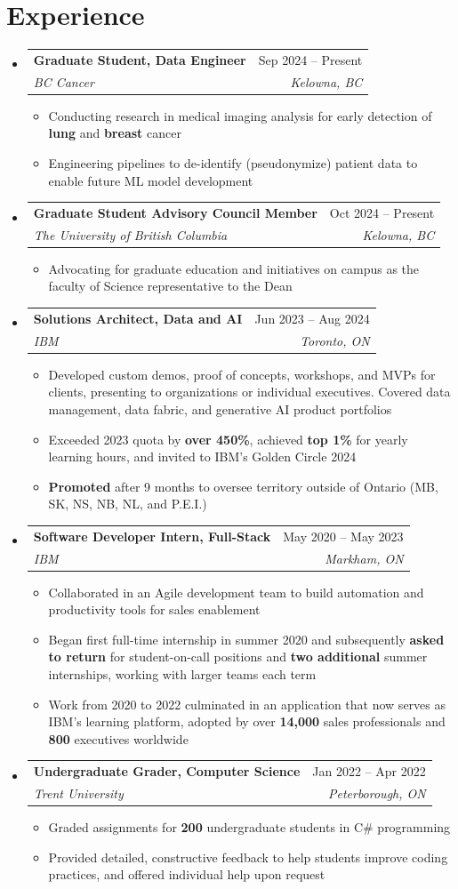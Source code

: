 \documentclass[letterpaper,10pt]{article}
\makeatletter
\newcommand{\resumeItem}[1]{
  \item\small{
    {#1 \vspace{-2pt}}
  }
}
\newcommand{\resumeSubheading}[4]{
  \vspace{-0.9pt}\item
    \begin{tabular*}{0.97\textwidth}[t]{l@{\extracolsep{\fill}}r}
      \textbf{\small#1} & \small#2 \\
      \textit{\small#3} & \textit{\small #4} \\
    \end{tabular*}\vspace{-7pt}
}
\newcommand{\resumeSubHeadingListStart}{\begin{itemize}[leftmargin=0.15in, label={}]}
\newcommand{\resumeSubHeadingListEnd}{\end{itemize}}
\newcommand{\resumeItemListStart}{\begin{itemize}}
\newcommand{\resumeItemListEnd}{\end{itemize}\vspace{-5pt}}
\makeatother
\begin{document}
\section{Experience}
  \resumeSubHeadingListStart
    \resumeSubheading
      {Graduate Student, Data Engineer}{Sep 2024 -- Present}
      {BC Cancer}{Kelowna, BC}
      \resumeItemListStart
        \resumeItem{Conducting research in medical imaging analysis for early detection of \textbf{lung} and \textbf{breast} cancer}
        \resumeItem{Engineering pipelines to de-identify (pseudonymize) patient data to enable future ML model development}
      \resumeItemListEnd
    \resumeSubheading
      {Graduate Student Advisory Council Member}{Oct 2024 -- Present}
      {The University of British Columbia}{Kelowna, BC}
      \resumeItemListStart
        \resumeItem{Advocating for graduate education and initiatives on campus as the faculty of Science representative to the Dean}
      \resumeItemListEnd
    \resumeSubheading
      {Solutions Architect, Data and AI}{Jun 2023 -- Aug 2024}
      {IBM}{Toronto, ON}
      \resumeItemListStart
        \resumeItem{Developed custom demos, proof of concepts, workshops, and MVPs for clients, presenting to organizations or individual executives. Covered data management, data fabric, and generative AI product portfolios}
        \resumeItem{Exceeded 2023 quota by \textbf{over 450\%}, achieved \textbf{top 1\%} for yearly learning hours, and invited to IBM's Golden Circle 2024}
        \resumeItem{\textbf{Promoted} after 9 months to oversee territory outside of Ontario (MB, SK, NS, NB, NL, and P.E.I.)}
      \resumeItemListEnd
    \resumeSubheading
      {Software Developer Intern, Full-Stack}{May 2020 -- May 2023}
      {IBM}{Markham, ON}
      \resumeItemListStart
        \resumeItem{Collaborated in an Agile development team to build automation and productivity tools for sales enablement}
        \resumeItem{Began first full-time internship in summer 2020 and subsequently \textbf{asked to return} for student-on-call positions and \textbf{two additional} summer internships, working with larger teams each term}
        \resumeItem{Work from 2020 to 2022 culminated in an application that now serves as IBM's learning platform, adopted by over \textbf{14,000} sales professionals and \textbf{800} executives worldwide}
      \resumeItemListEnd
      \resumeSubheading
      {Undergraduate Grader, Computer Science}{Jan 2022 -- Apr 2022}
      {Trent University}{Peterborough, ON}
      \resumeItemListStart
        \resumeItem{Graded assignments for \textbf{200} undergraduate students in C\# programming}
        \resumeItem{Provided detailed, constructive feedback to help students improve coding practices, and offered individual help upon request}
      \resumeItemListEnd
  \resumeSubHeadingListEnd
\end{document}
